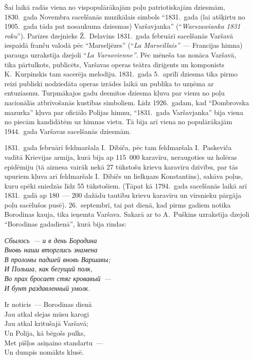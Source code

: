 \documentclass[twoside,a5paper,12pt,fleqn,openany]{extbook}
\newcommand{\pltxti}[1]{\textit{\textpolish{#1}}}
\newcommand{\rutxti}[1]{\textit{\textrussian{#1}}}
\newcommand{\frtxti}[1]{\textit{\textfrench{#1}}}
\begin{document}
Šai laikā radās viena no vispopulārākajām poļu patriotiskajām dziesmām, 1830.~gada Novembra sacelšanās muzikālais simbols ``1831.~gada (lai atšķirtu no 1905.~gada tāda pat nosaukuma dziesmas) Varšavjanka'' (``\pltxti{Warszawianka 1831 roku}''). Parīzes dzejnieks Ž.~Delavins 1831.~gada februārī sacelšanās Varšavā iespaidā franču valodā pēc ``Marseljēzes'' (``\frtxti{La Marseillais''}~--- Francijas himna) parauga uzrakstīja dzejoli ``\frtxti{La Varsovienne''}. Pēc mēneša tas nonāca Varšavā, tika pārtulkots, publicēts, Varšavas operas teātra diriģents un komponists K.~Kurpinskis tam sacerēja melodiju. 1831.~gada 5.~aprīlī dziesma tika pirmo reizi publiski nodziedāta operas izrādes laikā un publika to uzņēma ar entuziasmu. Turpmākajos gadu desmitos dziesma kļuva par vienu no poļu nacionālās atbrīvošanās kustības simboliem. Līdz 1926.~gadam, kad ``Dombrovska mazurka'' kļuva par oficiālo Polijas himnu, ``1831.~gada Varšavjanka'' bija viena no piecām kandidātēm uz himnas vietu. Tā bija arī viena no populārākajām 1944.~gada Varšavas sacelšanās dziesmām.

1831.~gada februārī feldmaršala I.~Dibiča, pēc tam feldmaršala I.~Paskeviča vadītā Krievijas armija, kurā bija ap 115~000 karavīru, neraugoties uz holēras epidēmiju (tā aiznesa vairāk nekā 27 tūkstošu krievu karavīru dzīvību, par tās upuriem kļuva arī feldmaršals I.~Dibičs un lielkņazs Konstantīns), sakāva poļus, kuru spēki sniedzās līdz 55 tūkstošiem. (Tāpat kā 1794.~gada sacelšanās laikā arī 1831.~gadā ap 180~--- 200 dažādu tautību krievu karavīru un virsnieku pārgāja poļu sacēlušos pusē). 26.~septembrī, tai pat dienā, kad pirms gadiem notika Borodinas kauja, tika ieņemta Varšava. Sakarā ar to A.~Puškins uzrakstīja dzejoli ``Borodinas gadadienā'', kurā bija rindas:

\vspace{1.5em}

\noindent
\begin{minipage}{0.55\textwidth}
\rutxti{
Сбылось~--- и в день Бородина\\
Вновь наши вторглись знамена\\
В проломы падшей вновь Варшавы;\\
И Польша, как бегущий полк,\\
Во прах бросает стяг кровавый~---\\
И бунт раздавленный умолк.}
\end{minipage}
\hspace{1em}
\begin{minipage}{0.5\textwidth}
Ir noticis~--- Borodinas dienā\\
Jau atkal slejas mūsu karogi\\
Jau atkal kritušajā Varšavā;\\
Un Polija, kā bēgošs pulks,\\
Met pīšļos asiņaino standartu~---\\
Un dumpis nomākts klusē.
\end{minipage}
\end{document}
